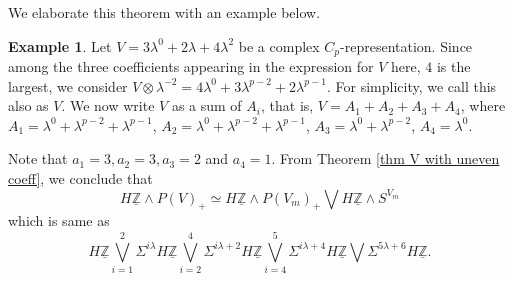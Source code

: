 \documentclass[a4paper,leqno,11pt]{amsart}
\theoremstyle{plain}
\theoremstyle{definition}
\newtheorem{exam}[theorem]{Example}
\theoremstyle{remark}
\theoremstyle{definition}
\newcommand{\uZ}{\underline{\mathbb{Z}}}
\numberwithin{equation}{section}
\newcommand{\smas}{\wedge}
\begin{document}
	We elaborate this theorem with an example below. 
	\begin{exam}
		Let $V = 3\lambda^0+ 2\lambda + 4\lambda^2$ be a complex $C_p$-representation. Since among the three coefficients appearing in the expression for $V$ here, $4$ is the largest, we consider $V\otimes\lambda^{-2} = 4\lambda^0 + 3\lambda^{p-2} + 2 \lambda^{p-1}$. For simplicity, we call this also as $V$. We now write $V$ as a sum of $A_i$, that is, $V= A_1 + A_2 + A_3 + A_4$, where $A_1 = \lambda^0 + \lambda^{p-2} + \lambda^{p-1}$, $A_2 = \lambda^0 + \lambda^{p-2} + \lambda^{p-1}$, $A_3 = \lambda^{0}+\lambda^{p-2}$, $A_4 = \lambda^0$.
		
		Note that $a_1 = 3, a_2 = 3, a_3 = 2$ and $a_4 = 1$. From Theorem \ref{thm V with uneven coeff}, we conclude that 
		$$H\uZ \smas P(V)_+ \simeq H\uZ \smas P(V_m)_+\bigvee H\uZ \smas S^{V_m}$$  which is same as  
		$$H\underline{\mathbb{Z}}\bigvee_{i=1}^{2}\Sigma^{i\lambda} H\uZ\bigvee_{i=2}^{4} \Sigma^{i\lambda+2}H\uZ \bigvee_{i=4}^{5 } \Sigma^{i\lambda + 4}H\uZ\bigvee \Sigma^{5 \lambda + 6}H\uZ.$$
	\end{exam}
\end{document}
